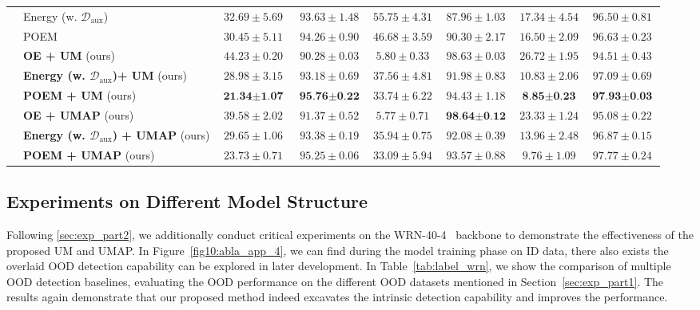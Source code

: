 \documentclass{article}
\theoremstyle{plain}
\theoremstyle{definition}
\theoremstyle{remark}
\begin{document}
\begin{table}[t!]
{\begin{tabular}{c|l|cccccc}
         & Energy (w. $\mathcal{D}_\text{aux}$) & $32.69\pm5.69$ & $93.63\pm1.48$ & $55.75\pm4.31$ & $87.96\pm1.03$ & $17.34\pm4.54$ & $96.50\pm0.81$\\
         & POEM & $30.45\pm5.11$ & $94.26\pm0.90$ & $46.68\pm3.59$ & $90.30\pm2.17$ & $16.50\pm2.09$ & $96.63\pm0.23$\\
         & \textbf{OE + UM} (ours) & $44.23\pm0.20$ & $90.28\pm0.03$ & $5.80\pm0.33$ & $98.63\pm0.03$ & $26.72\pm1.95$ & $94.51\pm0.43$\\
         & \textbf{Energy (w. $\mathcal{D}_\text{aux}$)+ UM} (ours) & $28.98\pm3.15$ & $93.18\pm0.69$ & $37.56\pm4.81$ & $91.98\pm0.83$ & $10.83\pm2.06$ & $97.09\pm0.69$\\
         & \textbf{POEM + UM} (ours) & $\textbf{21.34}\pm\textbf{1.07}$ & $\textbf{95.76}\pm\textbf{0.22}$ & $33.74\pm6.22$ & $94.43\pm1.18$ & $\textbf{8.85}\pm\textbf{0.23}$ & $\textbf{97.93}\pm\textbf{0.03}$\\
         & \textbf{OE + UMAP} (ours) & $39.58\pm2.02$ & $91.37\pm0.52$ & $5.77\pm0.71$ & $\textbf{98.64}\pm\textbf{0.12}$ & $23.33\pm1.24$ & $95.08\pm0.22$\\
         & \textbf{Energy (w. $\mathcal{D}_\text{aux}$) + UMAP} (ours) & $29.65\pm1.06$ & $93.38\pm0.19$ & $35.94\pm0.75$ & $92.08\pm0.39$ & $13.96\pm2.48$ & $96.87\pm0.15$\\
         & \textbf{POEM + UMAP} (ours) & $23.73\pm0.71$ & $95.25\pm0.06$ & $33.09\pm5.94$ & $93.57\pm0.88$ & $9.76\pm1.09$ & $97.77\pm0.24$\\
        \bottomrule[1.5pt]
    \end{tabular}}
    \label{tab:my_label4}
\end{table}


\subsection{Experiments on Different Model Structure}
\label{app:exp_diff_model}


Following \ref{sec:exp_part2}, we additionally conduct critical experiments on the WRN-40-4~\citep{lin2021mood} backbone to demonstrate the effectiveness of the proposed UM and UMAP. In Figure~\ref{fig10:abla_app_4}, we can find during the model training phase on ID data, there also exists the overlaid OOD detection capability can be explored in later development. In Table~\ref{tab:label_wrn}, we show the comparison of multiple OOD detection baselines, evaluating the OOD performance on the different OOD datasets mentioned in Section~\ref{sec:exp_part1}. The results again demonstrate that our proposed method indeed excavates the intrinsic detection capability and improves the performance. 
\end{document}

